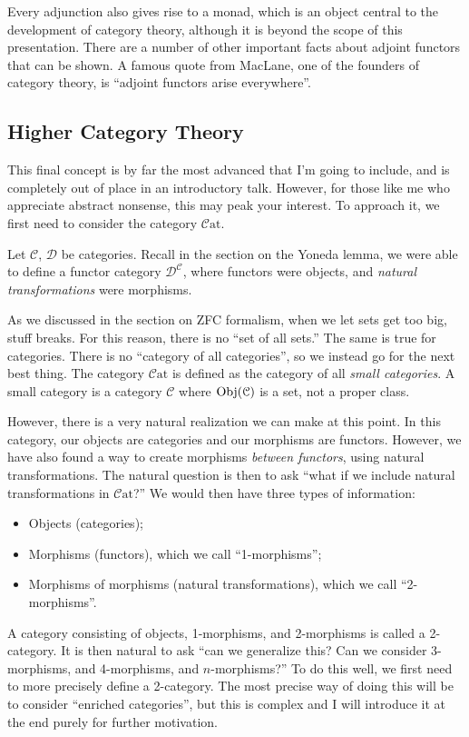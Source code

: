 \documentclass[11pt, letterpaper]{article}
\newcommand{\Cat}{\mathcal{C}\mathrm{at}}
\begin{document}
Every adjunction also gives rise to a monad, which is an object central to the development of category theory, although it is beyond the scope of this presentation. There are a number of other important facts about adjoint functors that can be shown. A famous quote from MacLane, one of the founders of category theory, is ``adjoint functors arise everywhere''.

\subsection{Higher Category Theory}
This final concept is by far the most advanced that I'm going to include, and is completely out of place in an introductory talk. However, for those like me who appreciate abstract nonsense, this may peak your interest. To approach it, we first need to consider the category $\Cat$.

Let $\mathcal{C} $, $\mathcal{D} $ be categories. Recall in the section on the Yoneda lemma, we were able to define a functor category $\mathcal{D} ^{\mathcal{C} } $, where functors were objects, and \emph{natural transformations} were morphisms.

As we discussed in the section on ZFC formalism, when we let sets get too big, stuff breaks. For this reason, there is no ``set of all sets.'' The same is true for categories. There is no ``category of all categories'', so we instead go for the next best thing. The category $\Cat$ is defined as the category of all \emph{small categories}. A small category is a category $\mathcal{C} $ where $\operatorname{Obj}(\mathcal{C} ) $ is a set, not a proper class.

However, there is a very natural realization we can make at this point. In this category, our objects are categories and our morphisms are functors. However, we have also found a way to create morphisms \emph{between functors}, using natural transformations. The natural question is then to ask ``what if we include natural transformations in $\Cat$?'' We would then have three types of information:
\begin{itemize}
	\item Objects (categories);
	\item Morphisms (functors), which we call ``1-morphisms'';
	\item Morphisms of morphisms (natural transformations), which we call ``2-morphisms''.
\end{itemize}
A category consisting of objects, 1-morphisms, and 2-morphisms is called a 2-category. It is then natural to ask ``can we generalize this? Can we consider 3-morphisms, and 4-morphisms, and $n$-morphisms?'' To do this well, we first need to more precisely define a 2-category. The most precise way of doing this will be to consider ``enriched categories'', but this is complex and I will introduce it at the end purely for further motivation.
\end{document}
